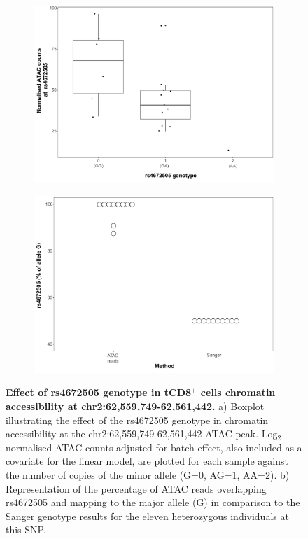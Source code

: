 \begin{figure}[htbp]
\centering
\begin{subfigure}{0.5\textwidth}
\centering
\includegraphics[width=\textwidth]{./Results2/pdfs/ATAC_caQTL_CD8_final}
\caption{\textbf{}}
\end{subfigure}%
\begin{subfigure}{0.5\textwidth}
\centering
\includegraphics[width=\textwidth]{./Results2/pdfs/chr2p15_rs4672505_allelic_imbalance_CD8_final}
\caption{\textbf{}}
\end{subfigure}
\caption[Effect of rs4672505 genotype in tCD8$^+$ cells chromatin accessibility at chr2:62,559,749-62,561,442.]{\textbf{Effect of rs4672505 genotype in tCD8$^+$ cells chromatin accessibility at chr2:62,559,749-62,561,442.} a) Boxplot illustrating the effect of the rs4672505 genotype in chromatin accessibility at the chr2:62,559,749-62,561,442 ATAC peak. Log$_2$ normalised ATAC counts adjusted for batch effect, also included as a covariate for the linear model, are plotted for each sample against the number of copies of the minor allele (G=0, AG=1, AA=2). b) Representation of the percentage of ATAC reads overlapping rs4672505 and mapping to the major allele (G) in comparison to the Sanger genotype results for the eleven heterozygous individuals at this SNP.}
\label{figure:ATAC_PS_CTL_caQTL_and_allelic_imbalance}
\end{figure} 
